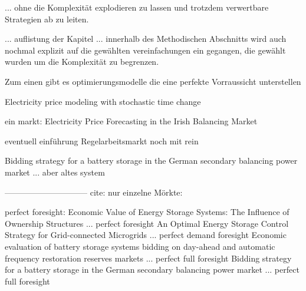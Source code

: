... ohne die Komplexität explodieren zu lassen und trotzdem verwertbare Strategien ab zu leiten.

... auflistung der Kapitel ... innerhalb des Methodischen Abschnitts wird auch nochmal explizit auf die gewählten vereinfachungen ein gegangen, die
gewählt wurden um die Komplexität zu begrenzen.

Zum einen gibt es optimierungsmodelle die eine perfekte Vorraussicht unterstellen


Electricity price modeling with stochastic time change

ein markt: Electricity Price Forecasting in the Irish Balancing Market

eventuell einführung Regelarbeitsmarkt noch mit rein

Bidding strategy for a battery storage in the German secondary balancing power market ... aber altes system

------------------------------
cite:
nur einzelne Mörkte:


perfect foresight:
Economic Value of Energy Storage Systems: The Influence of Ownership Structures ... perfect foresight
An Optimal Energy Storage Control Strategy for Grid-connected Microgrids ... perfect demand foresight
Economic evaluation of battery storage systems bidding on day-ahead and automatic frequency restoration reserves markets ... perfect full foresight
Bidding strategy for a battery storage in the German secondary balancing power market ... perfect full foresight


